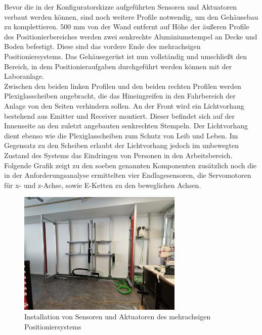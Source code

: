 \documentclass[../../../Bachelorarbeit.tex]{subfiles}
\begin{document}
Bevor die in der Konfiguratorskizze aufgeführten Sensoren und Aktuatoren verbaut werden können, sind noch weitere Profile notwendig, um den Gehäusebau zu komplettieren. 500 \si{\mm} von der Wand entfernt auf Höhe der äußeren Profile des Positionierbereiches werden zwei senkrechte Aluminiumstempel an Decke und Boden befestigt. Diese sind das vordere Ende des mehrachsigen Positioniersystems. Das Gehäusegerüst ist nun vollständig und umschließt den Bereich, in dem Positionieraufgaben durchgeführt werden können mit der Laboranlage.\\
Zwischen den beiden linken Profilen und den beiden rechten Profilen werden Plexiglasscheiben angebracht, die das Hineingreifen in den Fahrbereich der Anlage von den Seiten verhindern sollen. An der Front wird ein Lichtvorhang bestehend aus Emitter und Receiver montiert. Dieser befindet sich auf der Innenseite an den zuletzt angebauten senkrechten Stempeln. Der Lichtvorhang dient ebenso wie die Plexiglasscheiben zum Schutz von Leib und Leben. Im Gegensatz zu den Scheiben erlaubt der Lichtvorhang jedoch im unbewegten Zustand des Systems das Eindringen von Personen in den Arbeitsbereich.\\
Folgende Grafik zeigt zu den soeben genannten Komponenten zusätzlich noch die in der Anforderungsanalyse ermittelten vier Endlagesensoren, die Servomotoren für x- und z-Achse, sowie E-Ketten zu den beweglichen Achsen.

\begin{figure}[H]
    \centering
    \includegraphics[width=0.7\textwidth]{Images/AktuatorenSensoren.jpg}
    \caption[Aktuator- und Sensorinstallation]{Installation von Sensoren und Aktuatoren des mehrachsigen Positioniersystems}
    \label{fig:my-img22}
\end{figure}
\end{document}
